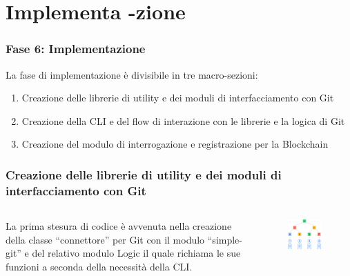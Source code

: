 \documentclass{beamer}
\begin{document}
\section{Implementa -zione}
\begin{frame}
	\frametitle{Fase 6: Implementazione}
	La fase di implementazione è divisibile in tre macro-sezioni:
	\begin{enumerate}
		\item Creazione delle librerie di utility e dei moduli di interfacciamento con Git
  		\item Creazione della CLI e del flow di interazione con le librerie e la logica di Git
  		\item Creazione del modulo di interrogazione e registrazione per la Blockchain
	\end{enumerate}
\end{frame}
\begin{frame}
	\frametitle{Creazione delle librerie di utility e dei moduli di interfacciamento con Git}
	\begin{columns}
		La prima stesura di codice è avvenuta nella creazione della classe “connettore” per Git con il modulo “simple-git” e del relativo modulo Logic il quale richiama le sue funzioni a seconda della necessità della CLI.
		\begin{figure}
			\includegraphics[width=0.88\textwidth]{figures/merkle-tree.png}
		\end{figure}
	\end{columns}
\end{frame}
\end{document}
